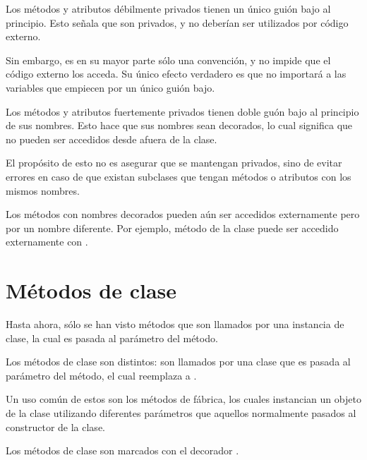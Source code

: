 Los métodos y atributos débilmente privados tienen un único guión bajo al principio.
Esto señala que son privados, y no deberían ser utilizados por código externo.



Sin embargo, es en su mayor parte sólo una convención, y no impide que el código externo los acceda.
Su único efecto verdadero es que  no importará a las variables que empiecen por un único guión bajo.


Los métodos y atributos fuertemente privados tienen doble guón bajo al principio de sus nombres.
Esto hace que sus nombres sean decorados, lo cual significa que no pueden ser accedidos desde afuera de la clase.

El propósito de esto no es asegurar que se mantengan privados, sino de evitar errores en caso de que existan subclases que tengan métodos o atributos con los mismos nombres.

Los métodos con nombres decorados pueden aún ser accedidos externamente pero por un nombre diferente.
Por ejemplo, método  de la clase  puede ser accedido externamente con .


\section{Métodos de clase}

Hasta ahora, sólo se han visto métodos que son llamados por una instancia de clase, la cual es pasada al parámetro  del método.

Los métodos de clase son distintos: son llamados por una clase que es pasada al parámetro  del método, el cual reemplaza a .

Un uso común de estos son los métodos de fábrica, los cuales instancian un objeto de la clase utilizando diferentes parámetros que aquellos normalmente pasados al constructor de la clase.

Los métodos de clase son marcados con el decorador .

